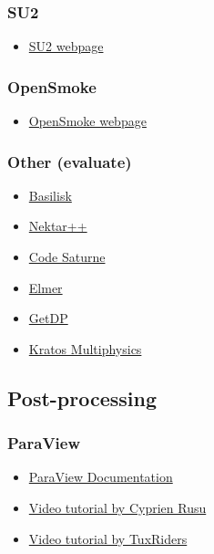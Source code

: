 \subsubsection{SU2}

\begin{itemize}
	\item\href{https://su2code.github.io/}
	{SU2 webpage}
\end{itemize}

\subsubsection{OpenSmoke}

\begin{itemize}
	\item\href{https://www.opensmokepp.polimi.it/}
	{OpenSmoke webpage}
\end{itemize}

\subsubsection{Other (evaluate)}

\begin{itemize}
	\item\href{http://basilisk.fr/}
	{Basilisk}
	\item\href{https://www.nektar.info/}
	{Nektar++}
	\item\href{https://www.code-saturne.org/cms/web/}
	{Code Saturne}
	\item\href{https://www.csc.fi/web/elmer}
	{Elmer}
	\item\href{https://getdp.info/}
	{GetDP}
	\item\href{https://github.com/KratosMultiphysics/Kratos}
	{Kratos Multiphysics}
\end{itemize}

\subsection{Post-processing}

\subsubsection{ParaView}

\begin{itemize}
	\item\href{https://docs.paraview.org/en/latest/}
	{ParaView Documentation}
	\item\href{https://www.youtube.com/playlist?list=PLvkU6i2iQ2fpcVsqaKXJT5Wjb9_ttRLK-}
	{Video tutorial by Cyprien Rusu}
	\item\href{https://www.youtube.com/playlist?list=PL6fjYEpJFi7W6ayU8zKi7G0-EZmkjtbPo}
	{Video tutorial by TuxRiders}
\end{itemize}

